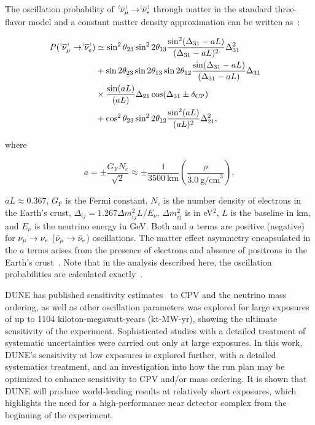 The oscillation probability of $\;\nu^{\bracketbar}_\mu \rightarrow \nu^{\bracketbar}_e$ through matter in the standard three-flavor model and a constant matter density approximation can be written as~\cite{Nunokawa:2007qh}:
\begin{linenomath*}
  \begin{equation}
    \begin{aligned}
      P(\;\nu^{\bracketbar}_\mu \rightarrow \nu^{\bracketbar}_e) & \simeq \sin^2 \theta_{23} \sin^2 2 \theta_{13} 
      \frac{ \sin^2(\Delta_{31} - aL)}{(\Delta_{31}-aL)^2} \Delta_{31}^2 \\
      & + \sin 2 \theta_{23} \sin 2 \theta_{13} \sin 2 \theta_{12}\frac{ \sin(\Delta_{31} - aL)}{(\Delta_{31}-aL)} \Delta_{31} \\
      &\times \frac{\sin(aL)}{(aL)} \Delta_{21} \cos (\Delta_{31} \pm \deltacp) & \\
      & + \cos^2 \theta_{23} \sin^2 2 \theta_{12} \frac {\sin^2(aL)}{(aL)^2} \Delta_{21}^2,
    \end{aligned}
    \label{eqn:appprob}
  \end{equation}
\end{linenomath*}
where
\begin{linenomath*}
  \begin{equation*}
    a = \pm \frac{G_{\mathrm{F}}N_e}{\sqrt{2}} \approx \pm\frac{1}{3500~\mathrm{km}}\left(\frac{\rho}{3.0~\mathrm{g/cm}^{3}}\right),
  \end{equation*}
\end{linenomath*}
$aL \approx 0.367$, $G_{\mathrm{F}}$ is the Fermi constant, $N_e$ is the number density of electrons in the Earth's crust, $\Delta_{ij} = 1.267 \Delta m^2_{ij} L/E_\nu$, $\Delta m^2_{ij}$ is in eV$^{2}$, $L$ is the baseline in km, and $E_\nu$ is the neutrino energy in GeV.
Both \deltacp and $a$ terms are positive (negative) for $\nu_\mu \to \nu_e$ ($\bar\nu_\mu \to \bar\nu_e$) oscillations. The matter effect asymmetry encapsulated in the $a$ terms arises from the presence of electrons and absence of positrons in the Earth's crust~\cite{Wolfenstein:1977ue,Mikheev:1986gs}. Note that in the analysis described here, the oscillation probabilities are calculated exactly~\cite{Kopp:2006wp}.

DUNE has published sensitivity estimates~\cite{Abi:2020qib} to CPV and the neutrino mass ordering, as well as other oscillation parameters was explored for large exposures of up to 1104 kiloton-megawatt-years (kt-MW-yr), showing the ultimate sensitivity of the experiment. Sophisticated studies with a detailed treatment of systematic uncertainties were carried out only at large exposures. In this work, DUNE's sensitivity at low exposures is explored further, with a detailed systematics treatment, and an investigation into how the run plan may be optimized to enhance sensitivity to CPV and/or mass ordering. It is shown that DUNE will produce world-leading results at relatively short exposures, which highlights the need for a high-performance near detector complex from the beginning of the experiment. 

